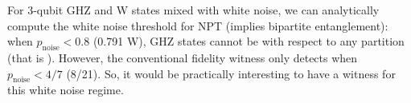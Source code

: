 \documentclass[
aps,
pra,
twocolumn,
floatfix,
]{revtex4-2}
\theoremstyle{plain}
\newtheorem{proposition}{Proposition}
\theoremstyle{definition}
\newtheorem{example}{Example}
\newcommand{\ew}{W}
\newcommand{\dm}{\rho}
\newcommand{\noise}{\text{noise}}
\begin{document}
For 3-qubit GHZ and W states mixed with white noise, we can analytically compute the white noise threshold for NPT (implies bipartite entanglement):
when $p_{\noise}<0.8$ (0.791 W), GHZ states cannot be  with respect to any partition (that is ).
However, the conventional fidelity witness only detects  when $p_{\noise}<4/7$ (8/21)\cite{guhneEntanglementDetection2009}.
So, it would be practically interesting to have a witness for this white noise regime.



\end{document}
